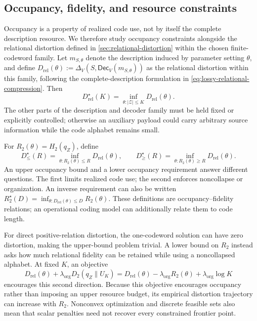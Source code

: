 \subsection{Occupancy, fidelity, and resource constraints}
\label{sec:occupancy-frontiers}

Occupancy is a property of realized code use, not by itself the complete description resource.
We therefore study occupancy constraints alongside the relational distortion defined in \cref{sec:relational-distortion} within the chosen finite-codeword family.
Let $m_{S,\theta}$ denote the description induced by parameter setting $\theta$, and define $D_{\mathrm{rel}}(\theta):=\Delta_V\!\left(S,\mathsf{Dec}_V(m_{S,\theta})\right)$ as the relational distortion within this family, following the complete-description formulation in \cref{eq:lossy-relational-compression}.
Then
\begin{equation}
D_{\mathrm{rel}}^\star(K)=\inf_{\theta:|\mathcal Z|\le K}D_{\mathrm{rel}}(\theta).
\end{equation}
The other parts of the description and decoder family must be held fixed or explicitly controlled; otherwise an auxiliary payload could carry arbitrary source information while the code alphabet remains small.

For $R_2(\theta)=H_2(q_Z)$, define
\begin{equation}
D_{\le}^\star(R)=\inf_{\theta:R_2(\theta)\le R}D_{\mathrm{rel}}(\theta),\qquad
D_{\ge}^\star(R)=\inf_{\theta:R_2(\theta)\ge R}D_{\mathrm{rel}}(\theta).
\label{eq:relational-complexity-distortion-frontier}
\end{equation}
An upper occupancy bound and a lower occupancy requirement answer different questions.
The first limits realized code use; the second enforces noncollapse or organization.
An inverse requirement can also be written $R_2^\star(D)=\inf_{\theta:D_{\mathrm{rel}}(\theta)\le D}R_2(\theta)$.
These definitions are occupancy--fidelity relations; an operational coding model can additionally relate them to code length.

For direct positive-relation distortion, the one-codeword solution can have zero distortion, making the upper-bound problem trivial.
A lower bound on $R_2$ instead asks how much relational fidelity can be retained while using a noncollapsed alphabet.
At fixed $K$, an objective
\begin{equation}
D_{\mathrm{rel}}(\theta)+\lambda_{\mathrm{org}}D_2(q_Z\|U_K)
=D_{\mathrm{rel}}(\theta)-\lambda_{\mathrm{org}}R_2(\theta)
+\lambda_{\mathrm{org}}\log K
\label{eq:organization-lagrangian}
\end{equation}
encourages this second direction.
Because this objective encourages occupancy rather than imposing an upper resource budget, its empirical distortion trajectory can increase with $R_2$.
Nonconvex optimization and discrete feasible sets also mean that scalar penalties need not recover every constrained frontier point.

